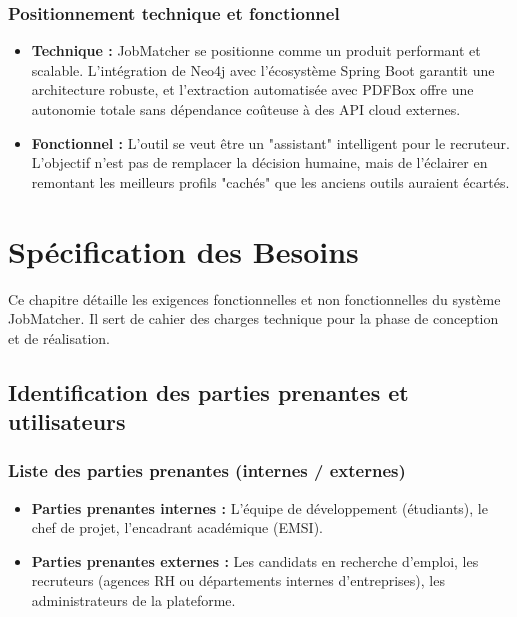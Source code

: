 \documentclass[12pt,a4paper]{report}
\begin{document}
\subsection{Positionnement technique et fonctionnel}
\begin{itemize}
    \item \textbf{Technique :} JobMatcher se positionne comme un produit performant et scalable. L'intégration de Neo4j avec l'écosystème Spring Boot garantit une architecture robuste, et l'extraction automatisée avec PDFBox offre une autonomie totale sans dépendance coûteuse à des API cloud externes.
    \item \textbf{Fonctionnel :} L'outil se veut être un "assistant" intelligent pour le recruteur. L'objectif n'est pas de remplacer la décision humaine, mais de l'éclairer en remontant les meilleurs profils "cachés" que les anciens outils auraient écartés.
\end{itemize}

\chapter{Spécification des Besoins}

Ce chapitre détaille les exigences fonctionnelles et non fonctionnelles du système JobMatcher. Il sert de cahier des charges technique pour la phase de conception et de réalisation.

\section{Identification des parties prenantes et utilisateurs}

\subsection{Liste des parties prenantes (internes / externes)}
\begin{itemize}
    \item \textbf{Parties prenantes internes :} L'équipe de développement (étudiants), le chef de projet, l'encadrant académique (EMSI).
    \item \textbf{Parties prenantes externes :} Les candidats en recherche d'emploi, les recruteurs (agences RH ou départements internes d'entreprises), les administrateurs de la plateforme.
\end{itemize}
\end{document}

